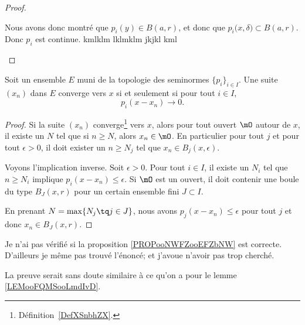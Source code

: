 \begin{proof}
\begin{subproof}
		Nous avons donc montré que \( p_i(y)\in B(a,r)\), et donc que \( p_i\big( x,\delta \big)\subset B(a,r)\). Donc \( p_i\) est continue.
		kmlklm
		lklmklm
		jkjkl
		kml
	\end{subproof}
\end{proof}

\begin{proposition} \label{PropQPzGKVk}
	Soit un ensemble \( E\) muni de la topologie des seminormes \( \{ p_i \}_{i\in I}\). Une suite \( (x_n)\) dans \( E\) converge vers \( x\) si et seulement si pour tout \( i\in I\),
	\begin{equation}
		p_i(x-x_n)\to 0.
	\end{equation}
\end{proposition}

\begin{proof}
	Si la suite \( (x_n)\) converge\footnote{Définition~\ref{DefXSnbhZX}.} vers \( x\), alors pour tout ouvert \( \mO\) autour de \( x\), il existe un \( N\) tel que si \( n\geq N\), alors \( x_n\in\mO\). En particulier pour tout \( j\) et pour tout \( \epsilon>0\), il doit exister un \( n\geq N_j\) tel que \( x_n\in B_j(x,\epsilon)\).

	Voyons l'implication inverse. Soit \( \epsilon>0\). Pour tout \( i\in I\), il existe un \( N_i\) tel que \( n\geq N_i\) implique \( p_i(x-x_n)\leq \epsilon\). Si \( \mO\) est un ouvert, il doit contenir une boule du type \( B_J(x,r)\) pour un certain ensemble fini \( J\subset I\).

	En prenant \( N=\max\{ N_j\tq j\in J \}\), nous avons \( p_j(x-x_n)\leq \epsilon\) pour tout \( j\) et donc \( x_n\in B_J(x,r)\).
\end{proof}

\begin{probleme}        %
	Je n'ai pas vérifié si la proposition \ref{PROPooNWFZooEFZbNW} est correcte. D'ailleurs je même pas trouvé l'énoncé; et j'avoue n'avoir pas trop cherché.

	La preuve serait sans doute similaire à ce qu'on a pour le lemme \ref{LEMooFQMSooLmdIvD}.
\end{probleme}

